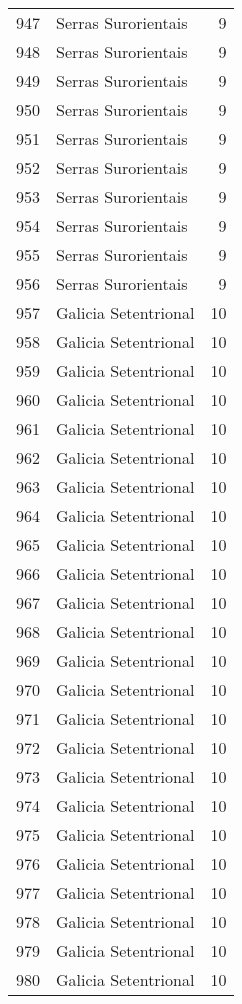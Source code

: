 \begin{table}[p]
\begin{tabular}{rlr}
  947 & Serras Surorientais &   9 \\ 
  948 & Serras Surorientais &   9 \\ 
  949 & Serras Surorientais &   9 \\ 
  950 & Serras Surorientais &   9 \\ 
  951 & Serras Surorientais &   9 \\ 
  952 & Serras Surorientais &   9 \\ 
  953 & Serras Surorientais &   9 \\ 
  954 & Serras Surorientais &   9 \\ 
  955 & Serras Surorientais &   9 \\ 
  956 & Serras Surorientais &   9 \\ 
  957 & Galicia Setentrional &  10 \\ 
  958 & Galicia Setentrional &  10 \\ 
  959 & Galicia Setentrional &  10 \\ 
  960 & Galicia Setentrional &  10 \\ 
  961 & Galicia Setentrional &  10 \\ 
  962 & Galicia Setentrional &  10 \\ 
  963 & Galicia Setentrional &  10 \\ 
  964 & Galicia Setentrional &  10 \\ 
  965 & Galicia Setentrional &  10 \\ 
  966 & Galicia Setentrional &  10 \\ 
  967 & Galicia Setentrional &  10 \\ 
  968 & Galicia Setentrional &  10 \\ 
  969 & Galicia Setentrional &  10 \\ 
  970 & Galicia Setentrional &  10 \\ 
  971 & Galicia Setentrional &  10 \\ 
  972 & Galicia Setentrional &  10 \\ 
  973 & Galicia Setentrional &  10 \\ 
  974 & Galicia Setentrional &  10 \\ 
  975 & Galicia Setentrional &  10 \\ 
  976 & Galicia Setentrional &  10 \\ 
  977 & Galicia Setentrional &  10 \\ 
  978 & Galicia Setentrional &  10 \\ 
  979 & Galicia Setentrional &  10 \\ 
  980 & Galicia Setentrional &  10 \\ 

\end{tabular}
\end{table}
